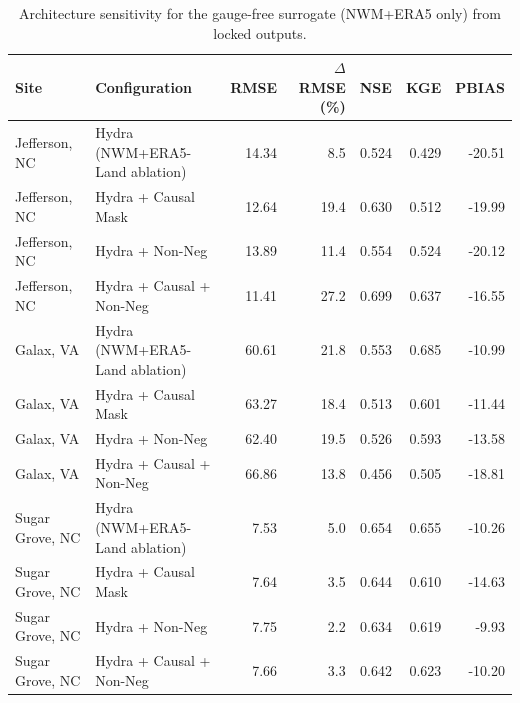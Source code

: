 \begin{table}
\centering
\caption{Architecture sensitivity for the gauge-free surrogate (NWM+ERA5 only) from locked outputs.}
\small
\begin{tabular}{ll r r r r r}
\toprule
\textbf{Site} & \textbf{Configuration} & \textbf{RMSE} & \textbf{$\Delta$RMSE (\%)} & \textbf{NSE} & \textbf{KGE} & \textbf{PBIAS} \\
\midrule
Jefferson, NC & Hydra (NWM+ERA5-Land ablation) & 14.34 & 8.5 & 0.524 & 0.429 & -20.51 \\
Jefferson, NC & Hydra + Causal Mask & 12.64 & 19.4 & 0.630 & 0.512 & -19.99 \\
Jefferson, NC & Hydra + Non-Neg & 13.89 & 11.4 & 0.554 & 0.524 & -20.12 \\
Jefferson, NC & Hydra + Causal + Non-Neg & 11.41 & 27.2 & 0.699 & 0.637 & -16.55 \\
Galax, VA & Hydra (NWM+ERA5-Land ablation) & 60.61 & 21.8 & 0.553 & 0.685 & -10.99 \\
Galax, VA & Hydra + Causal Mask & 63.27 & 18.4 & 0.513 & 0.601 & -11.44 \\
Galax, VA & Hydra + Non-Neg & 62.40 & 19.5 & 0.526 & 0.593 & -13.58 \\
Galax, VA & Hydra + Causal + Non-Neg & 66.86 & 13.8 & 0.456 & 0.505 & -18.81 \\
Sugar Grove, NC & Hydra (NWM+ERA5-Land ablation) & 7.53 & 5.0 & 0.654 & 0.655 & -10.26 \\
Sugar Grove, NC & Hydra + Causal Mask & 7.64 & 3.5 & 0.644 & 0.610 & -14.63 \\
Sugar Grove, NC & Hydra + Non-Neg & 7.75 & 2.2 & 0.634 & 0.619 & -9.93 \\
Sugar Grove, NC & Hydra + Causal + Non-Neg & 7.66 & 3.3 & 0.642 & 0.623 & -10.20 \\
\bottomrule
\end{tabular}
\label{tab:ablation_arch}
\end{table}
